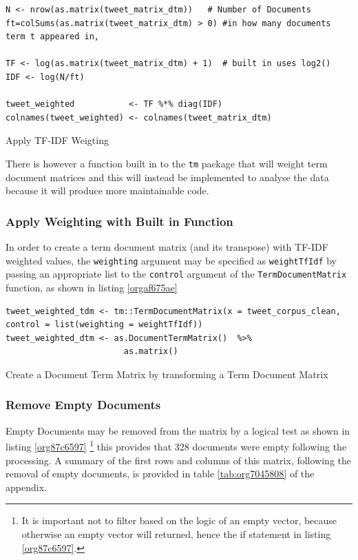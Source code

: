 \documentclass[11pt]{article}
\begin{document}
\begin{enumerate}
\begin{listing}[htbp]
\begin{verbatim}
N <- nrow(as.matrix(tweet_matrix_dtm))   # Number of Documents
ft=colSums(as.matrix(tweet_matrix_dtm) > 0) #in how many documents term t appeared in,

TF <- log(as.matrix(tweet_matrix_dtm) + 1)  # built in uses log2()
IDF <- log(N/ft)

tweet_weighted           <- TF %*% diag(IDF)
colnames(tweet_weighted) <- colnames(tweet_matrix_dtm)
\end{verbatim}
\caption{\label{org4bd13dd}Apply TF-IDF Weigting}
\end{listing}

There is however a function built in to the \texttt{tm} package that will weight term document matrices and this will instead be implemented to analyse the data because it will produce more maintainable code.
\end{enumerate}

\subsubsection{Apply Weighting with Built in Function}
\label{sec:orgc25b827}
In order to create a term document matrix (and its transpose) with TF-IDF weighted values, the \texttt{weighting} argument may be specified as \texttt{weightTfIdf} by passing an appropriate list to the \texttt{control} argument of the \texttt{TermDocumentMatrix} function, as shown in listing \ref{orgaf675ae}

\begin{listing}[htbp]
\begin{verbatim}
tweet_weighted_tdm <- tm::TermDocumentMatrix(x = tweet_corpus_clean, control = list(weighting = weightTfIdf))
tweet_weighted_dtm <- as.DocumentTermMatrix()  %>%
                        as.matrix()
\end{verbatim}
\caption{\label{orgaf675ae}Create a Document Term Matrix by transforming a Term Document Matrix}
\end{listing}

\subsubsection{Remove Empty Documents}
\label{sec:org0ad7ae9}
Empty Documents may be removed from the matrix by a logical test as shown in listing  \ref{org87c6597} \footnote{It is important not to filter based on the logic of an empty vector, because
otherwise an empty vector will returned, hence the if statement in listing \ref{org87c6597}.} this provides that 328 documents were empty following the processing. A summary of the first rows and columns of this matrix, following the removal of empty documents, is provided in table \ref{tab:org7045808} of the appendix.
\end{document}

